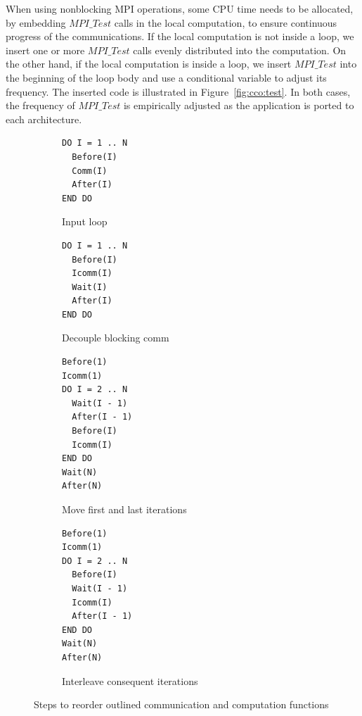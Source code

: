 When using nonblocking MPI operations, some CPU time needs to be allocated, by embedding $MPI\_Test$ calls in the local computation,
to ensure continuous progress of the communications.
If the local computation is not inside a loop, we insert one or more $MPI\_Test$ calls evenly distributed into the computation.
On the other hand, if the local computation is inside a loop,
  we insert $MPI\_Test$ into the beginning of the loop body and use a conditional variable to adjust its frequency.
The inserted code is illustrated in Figure~\ref{fig:cco:test}.
In both cases, the frequency of $MPI\_Test$ is empirically adjusted as the application is ported to each architecture.


\begin{figure}
{\scriptsize
  \centering
  \begin{subfigure}[b]{.25\textwidth}
\begin{verbatim}
DO I = 1 .. N
  Before(I)
  Comm(I)
  After(I)
END DO
\end{verbatim}
    \caption{Input loop}
    \label{fig:cco:reorder:a}
    \vspace{.1in}
  \end{subfigure}%
  \begin{subfigure}[b]{.25\textwidth}
\begin{verbatim}
DO I = 1 .. N
  Before(I)
  Icomm(I)
  Wait(I)
  After(I)
END DO
\end{verbatim}
    \caption{Decouple blocking comm}%
    \label{fig:cco:reorder:b}
    \vspace{.1in}
  \end{subfigure}
  \begin{subfigure}[b]{.25\textwidth}
\begin{verbatim}
Before(1)
Icomm(1)
DO I = 2 .. N
  Wait(I - 1)
  After(I - 1)
  Before(I)
  Icomm(I)
END DO
Wait(N)
After(N)
\end{verbatim}
    \caption{Move first and last iterations}
    \label{fig:cco:reorder:c}
  \end{subfigure}%
  \begin{subfigure}[b]{.25\textwidth}
\begin{verbatim}
Before(1)
Icomm(1)
DO I = 2 .. N
  Before(I)
  Wait(I - 1)
  Icomm(I)
  After(I - 1)
END DO
Wait(N)
After(N)
\end{verbatim}
    \caption{Interleave consequent iterations}
    \label{fig:cco:reorder:d}
  \end{subfigure}
\caption{Steps to reorder outlined communication and computation functions}
\label{fig:cco:reorder}
}%
\end{figure}

